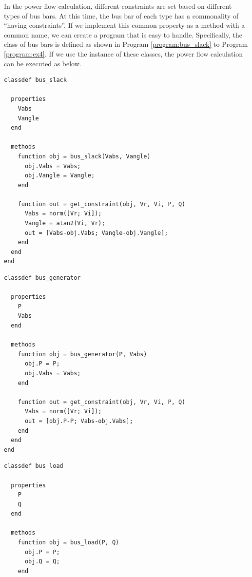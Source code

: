 \documentclass[tombow,dvipdfmx]{corona-a5-1.1}
\begin{document}
\begin{例}
In the power flow calculation, different constraints are set based on different types of bus bars.
At this time, the bus bar of each type has a commonality of “having constraints”.
If we implement this common property as a method with a common name, we can create a program that is easy to handle.
Specifically, the class of bus bars is defined as shown in Program \ref{program:bus_slack} to Program \ref{program:ex4}.
If we use the instance of these classes, the power flow calculation can be executed as below.

\smallskip
\begin{PROGRAMA}[count,title={bus\_slack.m}]\label{program:bus_slack}
\begin{verbatim}
classdef bus_slack
  
  properties
    Vabs
    Vangle
  end
  
  methods
    function obj = bus_slack(Vabs, Vangle)
      obj.Vabs = Vabs;
      obj.Vangle = Vangle;
    end
    
    function out = get_constraint(obj, Vr, Vi, P, Q)
      Vabs = norm([Vr; Vi]);
      Vangle = atan2(Vi, Vr);
      out = [Vabs-obj.Vabs; Vangle-obj.Vangle];
    end
  end
end
\end{verbatim}
\end{PROGRAMA}

\smallskip
\begin{PROGRAMA}[count,title={bus\_genertor.m}]\label{program:bus_PV}
\begin{verbatim}
classdef bus_generator
  
  properties
    P
    Vabs
  end
  
  methods
    function obj = bus_generator(P, Vabs)
      obj.P = P;
      obj.Vabs = Vabs;
    end
    
    function out = get_constraint(obj, Vr, Vi, P, Q)
      Vabs = norm([Vr; Vi]);
      out = [obj.P-P; Vabs-obj.Vabs];
    end
  end
end
\end{verbatim}
\end{PROGRAMA}

\smallskip
\begin{PROGRAMA}[count,title={bus\_load.m}]\label{program:bus_PQ}
\begin{verbatim}
classdef bus_load
  
  properties
    P
    Q
  end
  
  methods
    function obj = bus_load(P, Q)
      obj.P = P;
      obj.Q = Q;
    end
    

\end{verbatim}
\end{PROGRAMA}
\end{例}
\end{document}
